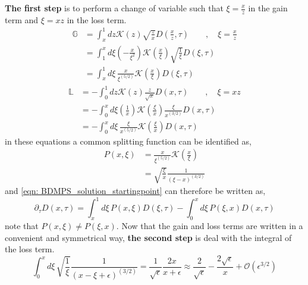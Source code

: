 \documentclass[main.tex]{subfiles}
\begin{document}
\textbf{The first step} is to perform a change of variable such that \(\xi = \frac{x}{z}\) in the gain term and \(\xi = xz\) in the loss term. 
\begin{align}\label{eqn: BDMPS_solution_gainterm_changeofvariable}
    \mathbb{G} &= \int_x^1 dz \mathcal{K}(z) \sqrt{\frac{z}{x}} D(\frac{x}{z}, \tau) \qquad,\quad \xi = \frac{x}{z} \nonumber \\
    &= \int_1^x d\xi (-\frac{x}{\xi^2}) \mathcal{K}(\frac{x}{\xi}) \sqrt{\frac{1}{\xi}} D(\xi, \tau) \nonumber \\
    &= \int_x^1 d\xi \,\frac{x}{\xi^(5/2)} \mathcal{K}(\frac{x}{\xi}) D(\xi, \tau)
\end{align}
\begin{align}\label{eqn: BDMPS_solution_lossterm_changeofvariable}
    \mathbb{L} &= - \int_0^1 dz \mathcal{K}(z) \frac{z}{\sqrt{x}} D(x,\tau)\qquad , \quad \xi = xz \nonumber \\
    &= - \int_0^x d\xi (\frac{1}{x}) \mathcal{K}(\frac{\xi}{x}) \frac{\xi}{x^(3/2)} D(x,\tau) \nonumber \\
    &= - \int_0^x d\xi \,\frac{\xi}{x^(5/2)} \mathcal{K}(\frac{\xi}{x}) D(x,\tau)
\end{align}
in these equations a common splitting function can be identified as, 
\begin{align}\label{eqn: BDMPS_solution_splittingfunction_xivariable}
    P(x,\xi) &= \frac{x}{\xi^(5/2)} \mathcal{K}(\frac{x}{\xi}) \nonumber \\
    &= \sqrt{\frac{\xi}{x}} \frac{1}{(\xi-x)^{(3/2)}}
\end{align}
and \autoref{eqn: BDMPS_solution_startingpoint} can therefore be written as, 
\begin{equation}\label{eqn: BDMPS_solution_evoleqn_with_xisplitfunc}
    \partial_\tau D(x,\tau) = \int_x^1 d\xi \,P(x,\xi) D(\xi, \tau) - \int_0^x d\xi \,P(\xi,x) D(x,\tau)
\end{equation}
note that \(P(x,\xi) \neq P(\xi, x)\). 
Now that the gain and loss terms are written in a convenient and symmetrical way, \textbf{the second step} is deal with the integral of the loss term.
\begin{equation}
    \int_0^x d\xi \, \sqrt{\frac{1}{\xi}} \frac{1}{(x-\xi+\epsilon)^{(3/2)}} = \frac{1}{\sqrt{\epsilon}} \frac{2x}{x+\epsilon} \approx \frac{2}{\sqrt \epsilon} - \frac{2\sqrt{\epsilon}}{x} + \mathcal{O}(\epsilon^{3/2}) 
\end{equation}
\end{document}
